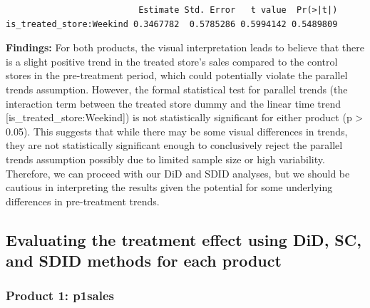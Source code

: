 \documentclass[
  letterpaper,
  DIV=11,
  numbers=noendperiod]{scrartcl}
\begin{document}
\begin{verbatim}
                          Estimate Std. Error   t value  Pr(>|t|)
is_treated_store:Weekind 0.3467782  0.5785286 0.5994142 0.5489809
\end{verbatim}

\textbf{Findings:} For both products, the visual interpretation leads to
believe that there is a slight positive trend in the treated store's
sales compared to the control stores in the pre-treatment period, which
could potentially violate the parallel trends assumption. However, the
formal statistical test for parallel trends (the interaction term
between the treated store dummy and the linear time trend
{[}is\_treated\_store:Weekind{]}) is not statistically significant for
either product (p \textgreater{} 0.05). This suggests that while there
may be some visual differences in trends, they are not statistically
significant enough to conclusively reject the parallel trends assumption
possibly due to limited sample size or high variability. Therefore, we
can proceed with our DiD and SDID analyses, but we should be cautious in
interpreting the results given the potential for some underlying
differences in pre-treatment trends.

\subsection{Evaluating the treatment effect using DiD, SC, and SDID
methods for each
product}\label{evaluating-the-treatment-effect-using-did-sc-and-sdid-methods-for-each-product}

\subsubsection{Product 1: p1sales}\label{product-1-p1sales}
\end{document}
